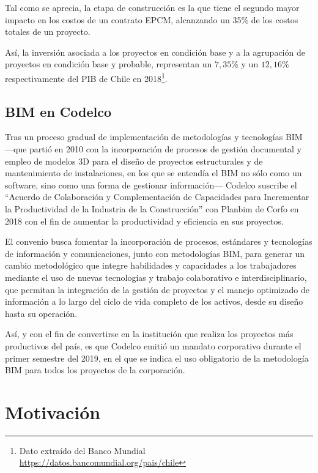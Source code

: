 Tal como se aprecia, la etapa de construcción es la que tiene el segundo mayor impacto en los costos de un contrato EPCM, alcanzando un 35\% de los costos totales de un proyecto.

Así, la inversión asociada a los proyectos en condición base y a la agrupación de proyectos en condición base y probable, representan un $7,35$\% y un $12,16$\% respectivamente del PIB de Chile en 2018\footnote{Dato extraído del Banco Mundial \url{https://datos.bancomundial.org/pais/chile}}.


\subsection{BIM en Codelco}


Tras un proceso gradual de implementación de metodologías y tecnologías BIM ---que partió en 2010 con la incorporación de procesos de gestión documental y empleo de modelos 3D para el diseño de proyectos estructurales y de mantenimiento de instalaciones, en los que se entendía el BIM no sólo como un software, sino como una forma de gestionar información--- Codelco suscribe el ``Acuerdo de Colaboración y Complementación de Capacidades para Incrementar la Productividad de la Industria de la Construcción'' con Planbim de Corfo en 2018 con el fin de aumentar la productividad y eficiencia en sus proyectos.

El convenio busca fomentar la incorporación de procesos, estándares y tecnologías de información y comunicaciones, junto con metodologías BIM, para generar un cambio metodológico que integre habilidades y capacidades a los trabajadores mediante el uso de nuevas tecnologías y trabajo colaborativo e interdisciplinario, que permitan la integración de la gestión de proyectos y el manejo optimizado de información a lo largo del ciclo de vida completo de los activos, desde su diseño hasta su operación.

Así, y con el fin de convertirse en la institución que realiza los proyectos más productivos del país, es que Codelco emitió un mandato corporativo durante el primer semestre del 2019, en el que se indica el uso obligatorio de la metodología BIM para todos los proyectos de la corporación.

\section{Motivación}


